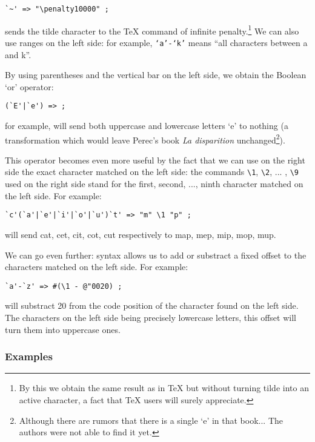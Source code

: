 \documentclass[a4paper,11pt]{article}
\begin{document}
\begin{verbatim}
`~' => "\penalty10000" ;
\end{verbatim}

\noindent sends the tilde character to the \TeX{} command of infinite
penalty.\footnote{By this we obtain the same result as in \TeX{} but
without turning tilde into an active character, a fact that \TeX{}
users will surely appreciate.} We can also use ranges on the left
side: for example, \texttt{`a'-`k'} means ``all characters between a
and k''.

By using parentheses and the vertical bar on the left side, we obtain
the Boolean `or' operator:

\begin{verbatim}
(`E'|`e') => ;
\end{verbatim}

\noindent for example, will send both uppercase and lowercase letters
`e' to nothing (a transformation which would leave Perec's book
\emph{La disparition} unchanged\footnote{Although there are rumors
that there is a single `e' in that book... The authors were not able
to find it yet.}).

This operator becomes even more useful by the fact that we can use on
the right side the exact character matched on the left side: the
commands \verb=\1=, \verb=\2=, ... , \verb=\9= used on the right side
stand for the first, second, ..., ninth character matched on the left
side. For example:

\begin{verbatim}
`c'(`a'|`e'|`i'|`o'|`u')`t' => "m" \1 "p" ;
\end{verbatim}

\noindent will send cat, cet, cit, cot, cut respectively to map, mep,
mip, mop, mup.

We can go even further: \OTP{} syntax allows us to add or substract a
fixed offset to the characters matched on the left side. For example:

\begin{verbatim}
`a'-`z' => #(\1 - @"0020) ;
\end{verbatim}

\noindent will substract 20 from the code position of the character
found on the left side. The characters on the left side being
precisely lowercase letters, this offset will turn them into uppercase
ones.

\subsubsection{Examples}
\end{document}

